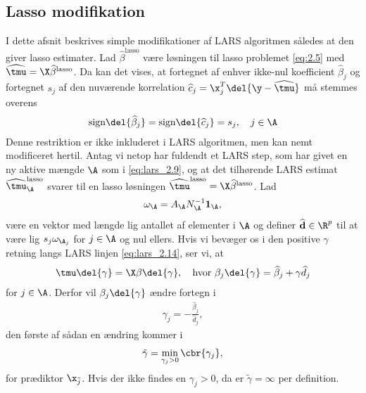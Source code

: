 \subsection{Lasso modifikation} \label{subsec:lasso_modifikation}
I dette afsnit beskrives simple modifikationer af LARS algoritmen således at den giver lasso estimater.
Lad \(\widehat{\beta}^\text{lasso}\) være løsningen til lasso problemet \eqref{eq:2.5} med \(\widehat{\tmu} = \X \widehat{\beta}^\text{lasso}\).
Da kan det vises, at fortegnet af enhver ikke-nul koefficient \(\widehat{\beta}_j\) og fortegnet \(s_j\) af den nuværende korrelation \(\widehat{c}_j = \x_j^T \del{\y - \widehat{\tmu}}\) må stemmes overens
\begin{align}
\text{sign} \del{\widehat{\beta}_j } = \text{sign} \del{\widehat{c}_j } = s_j, \quad j \in \A \label{eq:lars_3.1}
\end{align}
%
%
Denne restriktion er ikke inkluderet i LARS algoritmen, men kan nemt modificeret hertil. 
Antag vi netop har fuldendt et LARS step, som har givet en ny aktive mængde \(\A\) som i \eqref{eq:lars_2.9}, og at det tilhørende LARS estimat \(\widehat{\tmu}_\A^\text{lasso}\) svarer til en lasso løsningen \(\widehat{\tmu}^\text{lasso} = \X \widehat{\beta}^\text{lasso}\).
Lad
\begin{align*}
\omega_\A = A_\A N_\A^{-1} \mathbf{1}_\A,
\end{align*}
være en vektor med længde lig antallet af elementer i \(\A\) og definer \(\widehat{\mathbf{d}} \in \R^p\) til at være lig \(s_j \omega_{\A_j}\) for \(j \in \A\) og nul ellers.
Hvis vi bevæger os i den positive \(\gamma\) retning langs LARS linjen \eqref{eq:lars_2.14}, ser vi, at
\begin{align*}
\tmu \del{\gamma} = \X \beta \del{\gamma}, \quad \text{hvor } \beta_j \del{\gamma} = \widehat{\beta}_j + \gamma \widehat{d}_j
\end{align*}
for \(j \in \A\).
Derfor vil \(\beta_j \del{\gamma}\) ændre fortegn i
\begin{align*}
\gamma_j = -\frac{\widehat{\beta}_j}{\widehat{d}_j},
\end{align*}
den første af sådan en ændring kommer i
\begin{align*}
\tilde{\gamma} = \min_{\gamma_j > 0} \cbr{\gamma_j},
\end{align*}
for prædiktor \(\x_{\tilde{j}}\).
Hvis der ikke findes en \(\gamma_j > 0\), da er \(\tilde{\gamma}=\infty\) per definition.

